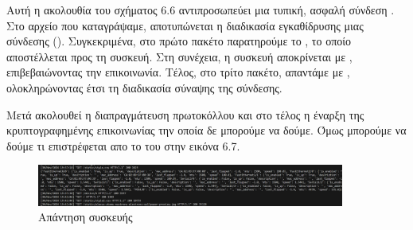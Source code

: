 \FloatBarrier

Αυτή η ακολουθία του σχήματος 6.6 αντιπροσωπεύει μια τυπική, ασφαλή σύνδεση . Στο αρχείο  που καταγράψαμε, αποτυπώνεται η διαδικασία εγκαθίδρυσης μιας σύνδεσης  (). Συγκεκριμένα, στο πρώτο πακέτο παρατηρούμε το , το οποίο αποστέλλεται   προς τη συσκευή. Στη συνέχεια, η συσκευή αποκρίνεται με , επιβεβαιώνοντας την επικοινωνία. Τέλος, στο τρίτο πακέτο, απαντάμε με , ολοκληρώνοντας έτσι τη διαδικασία σύναψης της σύνδεσης.

Μετά ακολουθεί η διαπραγμάτευση πρωτοκόλλου  και στο τέλος η έναρξη της κρυπτογραφημένης επικοινωνίας την οποία δε μπορούμε να δούμε. Όμως μπορούμε να δούμε τι επιστρέφεται 
απο το  του  στην  εικόνα 6.7.

\FloatBarrier
\begin{figure}[htb]
	\centering
	\includegraphics[width=0.9\textwidth]{graphics/rest.png}
	\caption{Απάντηση συσκευής}
\end{figure}

\FloatBarrier







